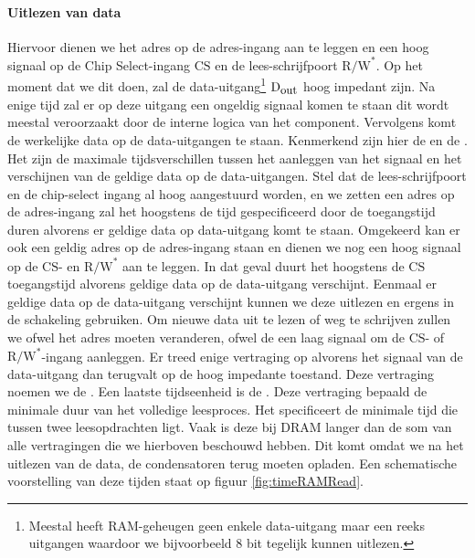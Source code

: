 \paragraph{Uitlezen van data}Hiervoor dienen we het adres op de adres-ingang aan te leggen en een hoog signaal op de Chip Select-ingang $\mbox{CS}$ en de lees-schrijfpoort $\mbox{R/W}^*$. Op het moment dat we dit doen, zal de data-uitgang\footnote{Meestal heeft RAM-geheugen geen enkele data-uitgang maar een reeks uitgangen waardoor we bijvoorbeeld 8 bit tegelijk kunnen uitlezen.} $\mbox{D}_{\mbox{\small{out}}}$ hoog impedant zijn. Na enige tijd zal er op deze uitgang een ongeldig signaal komen te staan dit wordt meestal veroorzaakt door de interne logica van het component. Vervolgens komt de werkelijke data op de data-uitgangen te staan. Kenmerkend zijn hier de  en de . Het zijn de maximale tijdsverschillen tussen het aanleggen van het signaal en het verschijnen van de geldige data op de data-uitgangen. Stel dat de lees-schrijfpoort en de chip-select ingang al hoog aangestuurd worden, en we zetten een adres op de adres-ingang zal het hoogstens de tijd gespecificeerd door de toegangstijd duren alvorens er geldige data op data-uitgang komt te staan. Omgekeerd kan er ook een geldig adres op de adres-ingang staan en dienen we nog een hoog signaal op de $\mbox{CS}$- en $\mbox{R/W}^*$ aan te leggen. In dat geval duurt het hoogstens de $\mbox{CS}$ toegangstijd alvorens geldige data op de data-uitgang verschijnt. Eenmaal er geldige data op de data-uitgang verschijnt kunnen we deze uitlezen en ergens in de schakeling gebruiken. Om nieuwe data uit te lezen of weg te schrijven zullen we ofwel het adres moeten veranderen, ofwel de een laag signaal om de $\mbox{CS}$- of $\mbox{R/W}^*$-ingang aanleggen. Er treed enige vertraging op alvorens het signaal van de data-uitgang dan terugvalt op de hoog impedante toestand. Deze vertraging noemen we de . Een laatste tijdseenheid is de . Deze vertraging bepaald de minimale duur van het volledige leesproces. Het specificeert de minimale tijd die tussen twee leesopdrachten ligt. Vaak is deze bij DRAM langer dan de som van alle vertragingen die we hierboven beschouwd hebben. Dit komt omdat we na het uitlezen van de data, de condensatoren terug moeten opladen. Een schematische voorstelling van deze tijden staat op figuur \ref{fig:timeRAMRead}.

